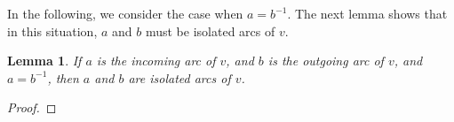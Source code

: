 \documentclass[12pt,letterpaper,oneside]{book}
\newtheorem{lemma}[theorem]{Lemma}
\begin{document}
In the following, we consider the case when $a=b^{-1}$.  The next lemma shows that in this situation, $a$ and $b$ 
must be isolated arcs of $v$.


\begin{lemma}\label{lemmaback} 
If $a$ is the incoming arc of $v$, and $b$ is the outgoing arc of $v$, and $a=b^{-1}$, then $a$ and $b$ are 
isolated arcs of $v$.
\end{lemma} 
\begin{proof} 




\end{proof}
\end{document}
